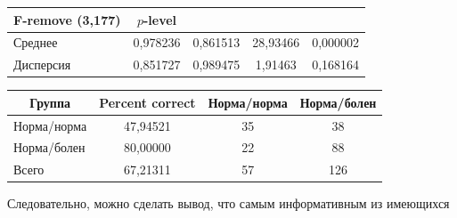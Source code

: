 \begin{table}
\begin{center}
\begin{tabular}{|l|c|c|c|c|}
{F-remove (3,177)} & {$p$-level}\\ 

\hline

Среднее & 0,978236 & 0,861513 & 28,93466 & 0,000002\\

Дисперсия & 0,851727 & 0,989475 & \hphantom{9}1,91463 & 0,168164\\

 \hline

\end{tabular}

\end{center}




\begin{center}


\vspace*{2ex}



\begin{tabular}{|l|c|c|c|}

\hline

\multicolumn{1}{|c|}{Группа} & {Percent correct} & {Норма/норма} & {Норма/болен}\\ 

\hline

Норма/норма & 47,94521 & 35 & 38 \\

Норма/болен & 80,00000 & 22 & 88 \\

\hline

Всего & 67,21311 & 57 & 126\hphantom{9}\\

 \hline

\end{tabular}

\end{center}

\end{table}





Следовательно, можно сделать вывод, что самым информативным из имеющихся 


